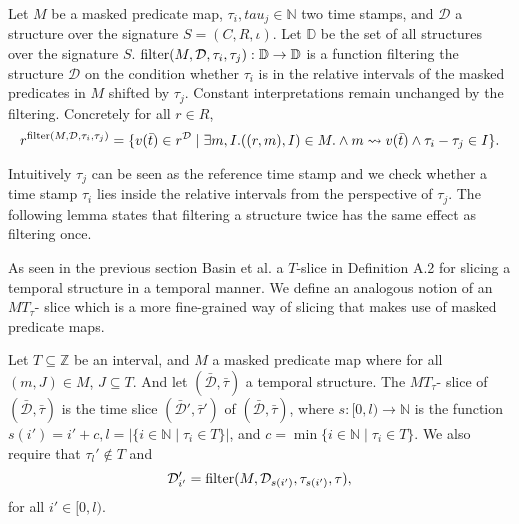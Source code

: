 \begin{definition}
    \label{def:filter}
    Let $M$ be a masked predicate map, $\tau_i, tau_j \in \mathbb{N}$ two time stamps, and $\mathcal{D}$ a structure over the signature $S = (C,R,\iota)$.
    Let $\mathbb{D}$ be the set of all structures over the signature $S$.
    $\operatorname{filter}(M, \mathcal{D}, \tau_i, \tau_j) : \mathbb{D} \to \mathbb{D}$ is a function filtering the structure $\mathcal{D}$ on the condition whether $\tau_i$ is in the relative intervals of the masked predicates in $M$ shifted by $\tau_j$.
    Constant interpretations remain unchanged by the filtering.
    Concretely for all $r \in R$, 
    \begin{equation*}
        r^{\operatorname{filter}(M, \mathcal{D}, \tau_i, \tau_j)} 
        = \{v(\bar{t}) \in r^{\mathcal{D}} \mid 
            \exists m,I. ((r,m), I) \in M. 
                \land m \rightsquigarrow v(\bar{t}) 
                \land \tau_i - 
                \tau_j \in I \}.
    \end{equation*}
\end{definition}
Intuitively $\tau_j$ can be seen as the reference time stamp and we check whether a time stamp $\tau_i$ lies inside the relative intervals from the perspective of $\tau_j$.
The following lemma states that filtering a structure twice has the same effect as filtering once.



As seen in the previous section Basin et al. \cite{Basin2016} a $T$-slice in Definition A.2 for slicing a temporal structure in a temporal manner.
We define an analogous notion of an $MT_{\tau}$- slice which is a more fine-grained way of slicing that makes use of masked predicate maps.
\begin{definition}
    \label{def:mt-slice}
    Let $T \subseteq \mathbb{Z}$ be an interval,
        and $M$ a masked predicate map
            where for all $(m, J) \in M$, $J \subseteq T$.
    And let $(\bar{\mathcal{D}}, \bar{\tau})$ a temporal structure.
    The $MT_{\tau}$- slice of $(\bar{\mathcal{D}}, \bar{\tau})$ is the time slice $(\bar{\mathcal{D}}', \bar{\tau}')$ of $(\bar{\mathcal{D}}, \bar{\tau})$, where $s:[0,l) \to \mathbb{N}$ is the function $s(i') = i' + c, l = |\{i \in \mathbb{N} \mid \tau_i \in T\}|$, and $c = \min\{i \in \mathbb{N} \mid \tau_i \in T \}$. 
    We also require that $\tau_l' \not\in T$ and 
    \begin{equation*}
        \mathcal{D}'_{i'} = \operatorname{filter}(M, \mathcal{D}_{s(i')}, \tau_{s(i')}, \tau),
    \end{equation*}
    for all $i' \in [0,l)$.
\end{definition}


